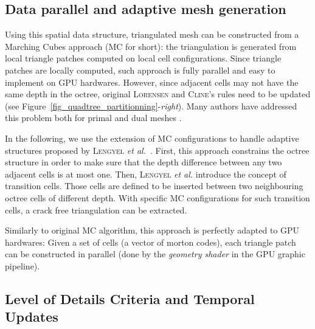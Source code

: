 \documentclass{llncs}
\begin{document}
\subsection{Data parallel and adaptive mesh generation}

Using this spatial data structure, triangulated mesh can be constructed
from a Marching Cubes approach \cite{lorensen1987marching} (MC for short): the
triangulation is generated from local triangle patches computed on
local cell configurations. Since triangle patches are locally
computed, such approach is fully parallel and easy to implement on GPU
hardwares. However, since adjacent cells may not have the same depth
in the octree, original \textsc{Lorensen} and \textsc{Cline}'s rules need to be
updated (see Figure~\ref{fig_quadtree_partitionning}-\emph{right}). Many authors have addressed this problem both for primal and
dual meshes
\cite{shu1995adaptive,schaefer2004dual,lengyel2010voxel,DBLP:journals/cgf/LewinerMPPL10,DBLP:journals/cvgip/LobelloDD14}.

In the following, we use the extension of MC configurations to handle
adaptive structures proposed by \textsc{Lengyel} \emph{et al.}~\cite{lengyel2010voxel}.
First, this approach constrains the octree
structure in order to make sure that the depth difference between any
two adjacent cells is at most one.
Then, \textsc{Lengyel} \emph{et al.} introduce the concept of transition cells.
Those cells are defined to be inserted between two neighbouring octree cells of different depth.
With specific MC configurations for such transition cells, a crack free triangulation can
be extracted.

Similarly to original MC algorithm, this approach is perfectly adapted
to GPU hardwares: Given a set of cells (a vector of morton codes),
each triangle patch can be constructed in parallel (done by
the \emph{geometry shader} in the GPU graphic pipeline).

\subsection{Level of Details Criteria and Temporal Updates}
\end{document}
